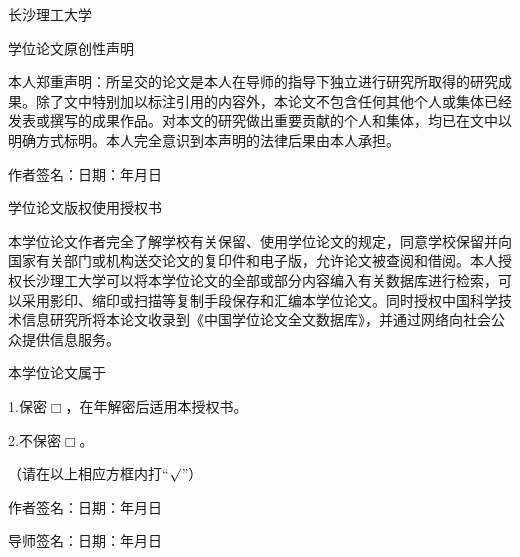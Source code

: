 \begin{center}\heiti 长沙理工大学\par 学位论文原创性声明\end{center}
本人郑重声明：所呈交的论文是本人在导师的指导下独立进行研究所取得的研究成果。除了文中特别加以标注引用的内容外，本论文不包含任何其他个人或集体已经发表或撰写的成果作品。对本文的研究做出重要贡献的个人和集体，均已在文中以明确方式标明。本人完全意识到本声明的法律后果由本人承担。
\par\vspace{15.6bp}\noindent 作者签名：\hspace{30mm}日期：\quad 年\quad 月\quad 日
\par\vspace{23.4bp}
\begin{center}\heiti 学位论文版权使用授权书\end{center}
本学位论文作者完全了解学校有关保留、使用学位论文的规定，同意学校保留并向国家有关部门或机构送交论文的复印件和电子版，允许论文被查阅和借阅。本人授权长沙理工大学可以将本学位论文的全部或部分内容编入有关数据库进行检索，可以采用影印、缩印或扫描等复制手段保存和汇编本学位论文。同时授权中国科学技术信息研究所将本论文收录到《中国学位论文全文数据库》，并通过网络向社会公众提供信息服务。
\par\vspace{8bp}\noindent 本学位论文属于\par
\noindent\hspace{2em}1.保密$\Box$，在\underline{\hspace{2em}}年解密后适用本授权书。\par
\noindent\hspace{2em}2.不保密$\Box$。\par
\noindent\hspace{2em}（请在以上相应方框内打“$\surd$”）\par
\vspace{15.6bp}\noindent 作者签名：\hspace{30mm}日期：\quad 年\quad 月\quad 日\par
\vspace{15.6bp}\noindent 导师签名：\hspace{30mm}日期：\quad 年\quad 月\quad 日\par
